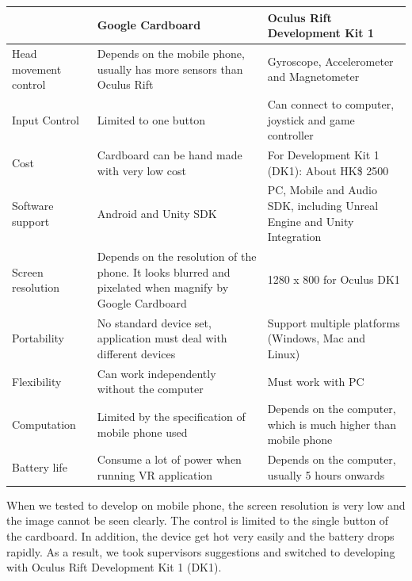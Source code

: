 \documentclass{article}
\begin{document}
\begin{center}
  \begin{tabular}{ | p{2cm} | p{6cm} | p{6cm} |}
    \hline
     & \textbf{Google Cardboard} & \textbf{Oculus Rift Development Kit 1} \\ \hline
    Head movement control & Depends on the mobile phone, usually has more sensors than Oculus Rift & Gyroscope, Accelerometer and Magnetometer\\ \hline
    Input Control & Limited to one button & Can connect to computer, joystick and game controller \\ \hline
    Cost & {Cardboard can be hand made with very low cost \hfill} & For Development Kit 1 (DK1): About HK\$ 2500 \\ \hline
    Software support & Android and Unity SDK & PC, Mobile and Audio SDK, including Unreal Engine and Unity Integration \\ \hline
    Screen resolution & Depends on the resolution of the phone. It looks blurred and pixelated when magnify by Google Cardboard & 1280 x 800 for Oculus DK1 \\ \hline
    Portability & No standard device set, application must deal with different devices & Support multiple platforms (Windows, Mac and Linux) \\ \hline
    Flexibility & Can work independently without the computer & Must work with PC \\ \hline
    Computation & Limited by the specification of mobile phone used & Depends on the computer, which is much higher than mobile phone \\
    \hline
    Battery life & Consume a lot of power when running VR application & Depends on the computer, usually 5 hours onwards \\
    \hline
  \end{tabular}
\end{center}
\smallskip
When we tested to develop on mobile phone, the screen resolution is very low and the image cannot be seen clearly. The control is limited to the single button of the cardboard. In addition, the device get hot very easily and the battery drops rapidly. As a result, we took supervisor\textsc{}s suggestions and switched to developing with Oculus Rift Development Kit 1 (DK1).
\smallskip
\end{document}

